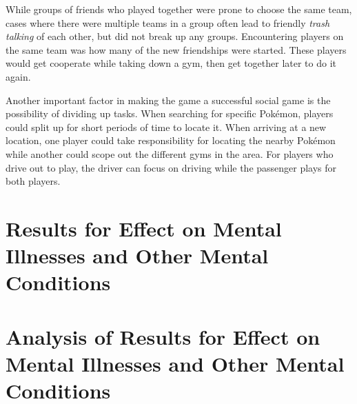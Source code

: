 While groups of friends who played together were prone to choose the same team, cases where there were multiple teams in a group often lead to friendly \emph{trash talking} of each other, but did not break up any groups. Encountering players on the same team was how many of the new friendships were started. These players would get cooperate while taking down a gym, then get together later to do it again.

Another important factor in making the game a successful social game is the possibility of dividing up tasks. When searching for specific Pokémon, players could split up for short periods of time to locate it. When arriving at a new location, one player could take responsibility for locating the nearby Pokémon while another could scope out the different gyms in the area. For players who drive out to play, the driver can focus on driving while the passenger plays for both players.

\section{Results for Effect on Mental Illnesses and Other Mental Conditions}

\section{Analysis of Results for Effect on Mental Illnesses and Other Mental Conditions}

